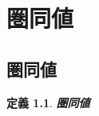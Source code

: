 \documentclass[dvipdfmx]{jsbook}
\theoremstyle{plain}
\newtheorem{Def}[thm]{定義}
\begin{document}
\chapter{圏同値}
\section{圏同値}
\begin{Def}
\bf{圏同値}
\end{Def}
\begin{comment}
\section{Haskにおける自然同型}
\subsection{mirror関数}
Tree関手からTree関手への自然同型
\subsection{Maybe関手とEither()関手の間の自然同型}
\section{まとめ}
aa
\end{comment}
\printindex
\end{document}
